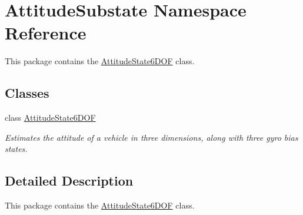 \hypertarget{namespaceAttitudeSubstate}{}\section{Attitude\+Substate Namespace Reference}
\label{namespaceAttitudeSubstate}


This package contains the \hyperlink{classAttitudeSubstate_1_1AttitudeState6DOF}{Attitude\+State6\+D\+OF} class.  


\subsection*{Classes}
\begin{DoxyCompactItemize}
\item 
class \hyperlink{classAttitudeSubstate_1_1AttitudeState6DOF}{Attitude\+State6\+D\+OF}
\begin{DoxyCompactList}\small\item\em Estimates the attitude of a vehicle in three dimensions, along with three gyro bias states. \end{DoxyCompactList}\end{DoxyCompactItemize}


\subsection{Detailed Description}
This package contains the \hyperlink{classAttitudeSubstate_1_1AttitudeState6DOF}{Attitude\+State6\+D\+OF} class. 

